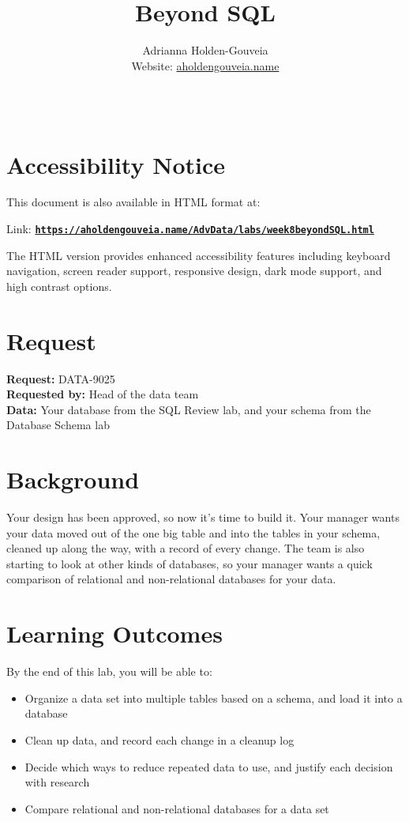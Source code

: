 \documentclass[12pt]{article}
\title{Beyond SQL}
\author{
        Adrianna Holden-Gouveia \\
        Website: \href{https://aholdengouveia.name}{aholdengouveia.name}\\ 
        \date{\vspace{-5ex}}
        \faGithub {: aholdengouveia} \\
        }
\begin{document}
    

\maketitle



\section*{Accessibility Notice}
This document is also available in HTML format at:

Link: \href{https://aholdengouveia.name/AdvData/labs/week8beyondSQL.html}{\textbf{\nolinkurl{https://aholdengouveia.name/AdvData/labs/week8beyondSQL.html}}}

The HTML version provides enhanced accessibility features including keyboard navigation, screen reader support, responsive design, dark mode support, and high contrast options.

\section*{Request}
\noindent\textbf{Request:} DATA-9025\\
\textbf{Requested by:} Head of the data team\\
\textbf{Data:} Your database from the SQL Review lab, and your schema from the Database Schema lab

\section*{Background}
Your design has been approved, so now it's time to build it. Your manager wants your data moved out of the one big table and into the tables in your schema, cleaned up along the way, with a record of every change. The team is also starting to look at other kinds of databases, so your manager wants a quick comparison of relational and non-relational databases for your data.

\section*{Learning Outcomes}
By the end of this lab, you will be able to:
\begin{itemize}
    \item Organize a data set into multiple tables based on a schema, and load it into a database
    \item Clean up data, and record each change in a cleanup log
    \item Decide which ways to reduce repeated data to use, and justify each decision with research
    \item Compare relational and non-relational databases for a data set
\end{itemize}
\end{document}
